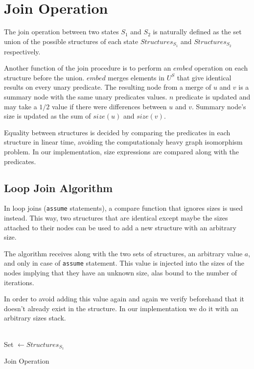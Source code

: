 \section*{Join Operation}
The join operation between two states $S_1$ and $S_2$ is naturally defined as the set union of the possible structures of each state $Structures_{S_1}$ and $Structures_{S_2}$ respectively.

Another function of the join procedure is to perform an $embed$ operation on each structure before the union. $embed$ merges elements in $U^S$ that give identical results on every unary predicate. The resulting node from a merge of $u$ and $v$ is a summary node with the same unary predicates values. $n$ predicate is updated and may take a $1/2$ value if there were differences between $u$ and $v$. Summary node's size is updated as the sum of $size(u)$ and $size(v)$.

Equality between structures is decided by comparing the predicates in each structure in linear time, avoiding the computationaly heavy graph isomorphism problem. In our implementation, size expressions are compared along with the predicates.

\subsection*{Loop Join Algorithm}
In loop joins (\texttt{assume} statements), a compare function that ignores sizes is used instead. This way, two structures that are identical except maybe the sizes attached to their nodes can be used to add a new structure with an arbitrary size.

The algorithm receives along with the two sets of structures, an arbitrary value $a$, and only in case of \texttt{assume} statement. This value is injected into the sizes of the nodes implying that they have an unknown size, alas bound to the number of iterations.

In order to avoid adding this value again and again we verify beforehand that it doesn't already exist in the structure. In our implementation we do it with an arbitrary sizes stack.
\\ \\
\begin{algorithm}[H]
	\SetAlgoLined
	Set $\leftarrow Structures_{S_1}$ \;
	\caption{Join Operation\label{IR}}
\end{algorithm}

